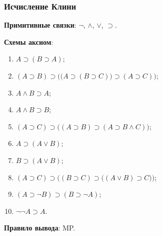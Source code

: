 \subsubsection{Исчисление Клини}
\textbf{Примитивные связки}: $\neg$, $\land$, $\lor$, $\supset$.

\textbf{Схемы аксиом}:
\begin{enumerate}[label=(А\arabic*)]
    \item $A \supset (B \supset A)$;
    \item $(A \supset B) \supset \Big(\big(A \supset (B \supset C)\big) \supset (A \supset C)\Big)$;
    \item $A \land B \supset A$;
    \item $A \land B \supset B$;
    \item $(A \supset C) \supset \big((A \supset B) \supset (A \supset B \land C)\big)$;
    \item $A \supset (A \lor B)$;
    \item $B \supset (A \lor B)$;
    \item $(A \supset C) \supset \Big((B \supset C) \supset \big((A \lor B) \supset C\big)\Big)$;
    \item $(A \supset \neg B) \supset (B \supset \neg A)$;
    \item $\neg\neg A \supset A$.
\end{enumerate}

\textbf{Правило вывода}: MP.